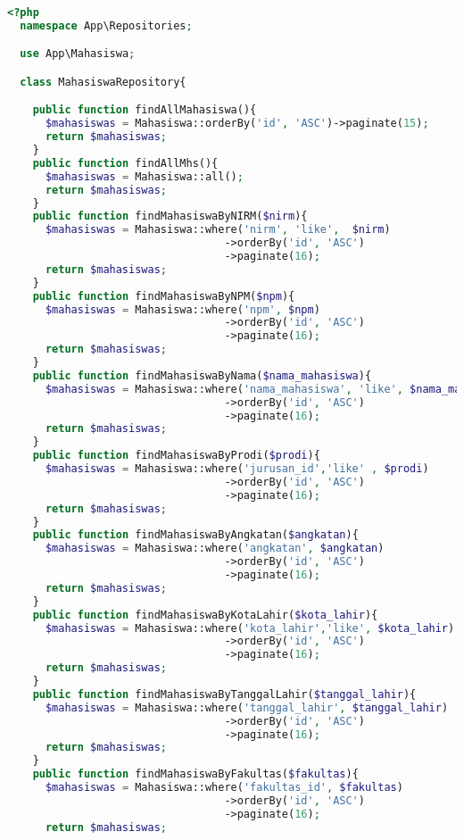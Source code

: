 \begin{lstlisting}[language=php, caption=MahasiswaRepository.php]
	<?php
  namespace App\Repositories;

  use App\Mahasiswa;

  class MahasiswaRepository{

    public function findAllMahasiswa(){
      $mahasiswas = Mahasiswa::orderBy('id', 'ASC')->paginate(15);
      return $mahasiswas;
    }
    public function findAllMhs(){
      $mahasiswas = Mahasiswa::all();
      return $mahasiswas;
    }
    public function findMahasiswaByNIRM($nirm){
      $mahasiswas = Mahasiswa::where('nirm', 'like',  $nirm)
                                  ->orderBy('id', 'ASC')
                                  ->paginate(16);
      return $mahasiswas;
    }
    public function findMahasiswaByNPM($npm){
      $mahasiswas = Mahasiswa::where('npm', $npm)
                                  ->orderBy('id', 'ASC')
                                  ->paginate(16);
      return $mahasiswas;
    }
    public function findMahasiswaByNama($nama_mahasiswa){
      $mahasiswas = Mahasiswa::where('nama_mahasiswa', 'like', $nama_mahasiswa)
                                  ->orderBy('id', 'ASC')
                                  ->paginate(16);
      return $mahasiswas;
    }
    public function findMahasiswaByProdi($prodi){
      $mahasiswas = Mahasiswa::where('jurusan_id','like' , $prodi)
                                  ->orderBy('id', 'ASC')
                                  ->paginate(16);
      return $mahasiswas;
    }
    public function findMahasiswaByAngkatan($angkatan){
      $mahasiswas = Mahasiswa::where('angkatan', $angkatan)
                                  ->orderBy('id', 'ASC')
                                  ->paginate(16);
      return $mahasiswas;
    }
    public function findMahasiswaByKotaLahir($kota_lahir){
      $mahasiswas = Mahasiswa::where('kota_lahir','like', $kota_lahir)
                                  ->orderBy('id', 'ASC')
                                  ->paginate(16);
      return $mahasiswas;
    }
    public function findMahasiswaByTanggalLahir($tanggal_lahir){
      $mahasiswas = Mahasiswa::where('tanggal_lahir', $tanggal_lahir)
                                  ->orderBy('id', 'ASC')
                                  ->paginate(16);
      return $mahasiswas;
    }
    public function findMahasiswaByFakultas($fakultas){
      $mahasiswas = Mahasiswa::where('fakultas_id', $fakultas)
                                  ->orderBy('id', 'ASC')
                                  ->paginate(16);
      return $mahasiswas;

\end{lstlisting}
